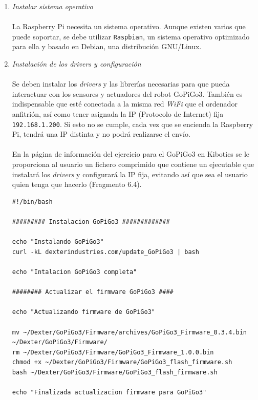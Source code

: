 \documentclass{report}
\begin{document}
\begin{enumerate}
	\item \textit{Instalar sistema operativo}
	\\
	\\
	La Raspberry Pi necesita un sistema operativo. Aunque existen varios que puede soportar, se debe utilizar \texttt{Raspbian}, un sistema operativo optimizado para ella y basado en Debian, una distribución GNU/Linux.
	\item \textit{Instalación de los drivers y configuración} 
	\\
	\\
	Se deben instalar los \textit{drivers} y las librerías necesarias para que pueda interactuar con los sensores y actuadores del robot GoPiGo3. También es indispensable que esté conectada a la misma red \textit{WiFi} que el ordenador anfitrión, así como tener asignada la IP (Protocolo de Internet) fija \texttt{192.168.1.200}. Si esto no se cumple, cada vez que se encienda la Raspberry Pi, tendrá una IP distinta y no podrá realizarse el envío.
	\\
	\\
	En la página de información del ejercicio para el GoPiGo3 en Kibotics se le proporciona al usuario un fichero comprimido que contiene un ejecutable que instalará los \textit{drivers} y configurará la IP fija, evitando así que sea el usuario quien tenga que hacerlo (Fragmento 6.4).
	\\
	\begin{lstlisting}[frame=single,breaklines=true, label=Ejecutable para la instalación y configuración de la Raspberry Pi, caption=Ejecutable para la instalación y configuración de la Raspberry Pi,  captionpos=b]
#!/bin/bash

######### Instalacion GoPiGo3 #############

echo "Instalando GoPiGo3"
curl -kL dexterindustries.com/update_GoPiGo3 | bash

echo "Intalacion GoPiGo3 completa"

######## Actualizar el firmware GoPiGo3 ####

echo "Actualizando firmware de GoPiGo3"

mv ~/Dexter/GoPiGo3/Firmware/archives/GoPiGo3_Firmware_0.3.4.bin ~/Dexter/GoPiGo3/Firmware/
rm ~/Dexter/GoPiGo3/Firmware/GoPiGo3_Firmware_1.0.0.bin
chmod +x ~/Dexter/GoPiGo3/Firmware/GoPiGo3_flash_firmware.sh
bash ~/Dexter/GoPiGo3/Firmware/GoPiGo3_flash_firmware.sh

echo "Finalizada actualizacion firmware para GoPiGo3"


\end{lstlisting}
\end{enumerate}
\end{document}
